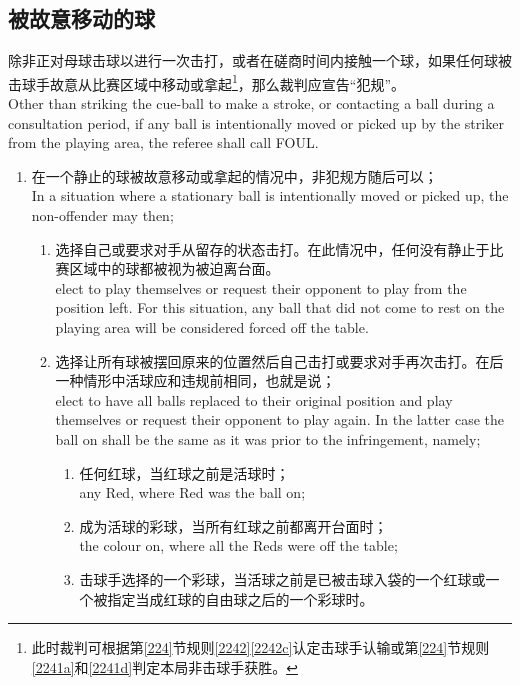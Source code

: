 \subsection{被故意移动的球}\label{22316}

\noindent 除非正对母球击球以进行一次击打，或者在磋商时间内接触一个球，如果任何球被击球手故意从比赛区域中移动或拿起\footnote{此时裁判可根据第\ref{224}节规则\ref{2242}\ref{2242c}认定击球手认输或第\ref{224}节规则\ref{2241a}和\ref{2241d}判定本局非击球手获胜。}，那么裁判应宣告``犯规''。\\
Other than striking the cue-ball to make a stroke, or contacting a ball during a consultation period, if any ball is intentionally moved or picked up by the striker from the playing area, the referee shall call FOUL.
\begin{enumerate}[label=(\alph*)]
    \item \label{22316a}在一个静止的球被故意移动或拿起的情况中，非犯规方随后可以；\\
    In a situation where a stationary ball is intentionally 
    moved or picked up, the non-offender may then;
    \begin{enumerate}[label=(\roman*)]
        \item 选择自己或要求对手从留存的状态击打。在此情况中，任何没有静止于比赛区域中的球都被视为被迫离台面。\\
        elect to play themselves or request their opponent to play from the position left. For this situation, any ball that did not come to rest on the playing area will be considered forced off the table.
        \item 选择让所有球被摆回原来的位置然后自己击打或要求对手再次击打。在后一种情形中活球应和违规前相同，也就是说；\\
        elect to have all balls replaced to their original position and play themselves or request their opponent to play again. In the latter case the ball on shall be the same as it was prior to the infringement, namely;
        \begin{enumerate}[label=(\roman*)]
            \item 任何红球，当红球之前是活球时；\\
            any Red, where Red was the ball on;
            \item 成为活球的彩球，当所有红球之前都离开台面时；\\
            the colour on, where all the Reds were off the table;
            \item 击球手选择的一个彩球，当活球之前是已被击球入袋的一个红球或一个被指定当成红球的自由球之后的一个彩球时。\\

\end{enumerate}
\end{enumerate}
\end{enumerate}

